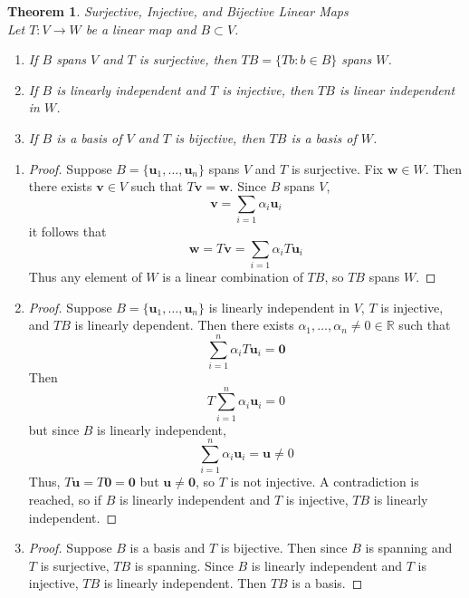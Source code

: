 \documentclass[12pt]{article}
\newtheorem{thm}{Theorem}[section] %
\theoremstyle{plain}
\newcommand{\R}{\mathbb{R}}
\newcommand{\vv}{\mathbf{v}}
\newcommand{\vu}{\mathbf{u}}
\newcommand{\vw}{\mathbf{w}}
\newcommand{\vzero}{\mathbf{0}}
\begin{document}
    \begin{thm}{Surjective, Injective, and Bijective Linear Maps}
        ~\\Let $T:V \to W$ be a linear map and $B \subset V$. 
        \begin{enumerate}
            \item If $B$ spans $V$ and $T$ is surjective, then $TB = \{Tb : b \in B\}$ spans $W$.
            \item If $B$ is linearly independent and $T$ is injective, then $TB$ is linear independent in $W$.
            \item If $B$ is a basis of $V$ and $T$ is bijective, then $TB$ is a basis of $W$.
        \end{enumerate}
    \end{thm}

    \begin{enumerate}
        \item \begin{proof}
            Suppose $B = \{\vu_1, \dots, \vu_n\}$ spans $V$ and $T$ is surjective. Fix $\vw \in W$. Then there exists $\vv \in V$ such that $T\vv = \vw$. Since $B$ spans $V$, $$\vv = \sum_{i = 1} \alpha_i \vu_i$$it follows that $$\vw = T\vv = \sum_{i = 1} \alpha_i T\vu_i$$Thus any element of $W$ is a linear combination of $TB$, so $TB$ spans $W$.
        \end{proof}
        \item \begin{proof}
            Suppose $B = \{\vu_1, \dots, \vu_n\}$ is linearly independent in $V$, $T$ is injective, and $TB$ is linearly dependent. Then there exists $\alpha_1, \dots, \alpha_n \neq 0\in \R$ such that $$\sum_{i = 1}^n \alpha_i T\vu_i = \vzero$$Then $$T\sum_{i = 1}^n \alpha_i \vu_i = 0$$but since $B$ is linearly independent, $$\sum_{i = 1}^n \alpha_i \vu_i = \vu \neq 0$$Thus, $T\vu = T\vzero = \vzero$ but $\vu \neq \vzero$, so $T$ is not injective. A contradiction is reached, so if $B$ is linearly independent and $T$ is injective, $TB$ is linearly independent.
        \end{proof}
        \item \begin{proof}
            Suppose $B$ is a basis and $T$ is bijective. Then since $B$ is spanning and $T$ is surjective, $TB$ is spanning. Since $B$ is linearly independent and $T$ is injective, $TB$ is linearly independent. Then $TB$ is a basis. 
        \end{proof}
    \end{enumerate}
\end{document}
